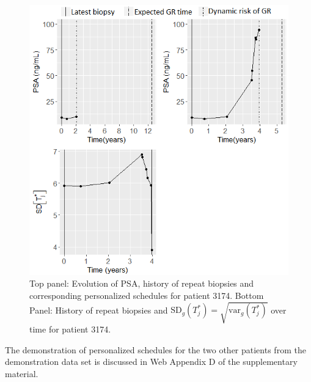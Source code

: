 \begin{figure}
\centerline{\includegraphics[width=\columnwidth]{images/prias_demo/case_3174.png}}
\caption{Top panel: Evolution of PSA, history of repeat biopsies and corresponding personalized schedules for patient 3174. Bottom Panel: History of repeat biopsies and $\mbox{SD}_g(T^*_j) = \sqrt{\mbox{var}_g(T^*_j)}$ over time for patient 3174.}
\label{fig : prias_demo_pid_3174}
\end{figure}

The demonstration of personalized schedules for the two other patients from the demonstration data set is discussed in Web Appendix D of the supplementary material.